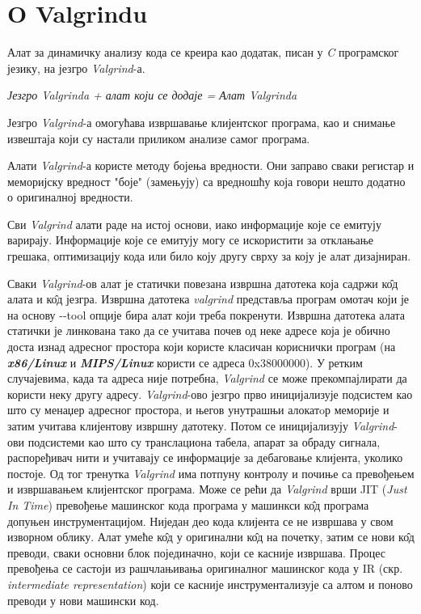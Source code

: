 \documentclass[12pt,oneside]{memoir}
\begin{document}
\section{O Valgrindu}

\indent Алат за динамичку анализу кода се креира као додатак, писан у \textit{C} програмског језику, на језгро \textit{Valgrind}-а. 


\begin{center}
\textit{Језгро Valgrinda + алат који се додаје = Алат Valgrinda} 
\end{center}


\indent Језгро \textit{Valgrind}-а омогућава извршавање клијентског програма, као и снимање извештаја који су настали приликом анализе самог програма. 

\indent Алати \textit{Valgrind}-а користе методу бојења вредности. Они заправо сваки регистар и меморијску вредност "боје" (замењују) са вредношћу која говори нешто додатно о оригиналној вредности. 

\indent Сви \textit{Valgrind} алати раде на истој основи, иако информације које се емитују варирају. Информације које се емитују могу се искористити за отклањање грешака, оптимизацију кода или било коју другу сврху за коју је алат дизајниран.

\indent Сваки \textit{Valgrind}-ов алат је статички повезана извршна датотека која садржи к\^{о}д алата и к\^{о}д језгра. Извршна датотека \textit{valgrind} представља програм омотач који је на основу -\--tool опције бира алат који треба покренути. Извршна датотека алата статички је линкована тако да се учитава почев од неке адресе која је обично доста изнад адресног простора који користе класичан кориснички програм (на \textbf{\textit{x86/Linux}} и \textbf{\textit{MIPS/Linux}} користи се адреса 0x38000000). У ретким случајевима, када та адреса није потребна, \textit{Valgrind} се може прекомпајлирати да користи неку другу адресу. \textit{Valgrind}-ово језгро прво иницијализује подсистем као што су менаџер адресног простора, и његов унутрашњи алокатoр меморије и затим учитава клијентову извршну датотеку. Потом се иницијализују \textit{Valgrind}-ови подсистеми као што су транслациона табела, апарат за обраду сигнала, распоређивач нити и учитавају се информације за дебаговање клијента, уколико постоје. Од тог тренутка \textit{Valgrind} има потпуну контролу и почиње са превођењем и извршавањем клијентског програма. Може се рећи да \textit{Valgrind} врши JIT (\textit{Just In Time}) превођење машинског кода програма у машинкси к\^{о}д програма допуњен инструментацијом. Ниједан део кода клијента се не извршава у свом изворном облику. Алат умеће к\^{о}д у оригинални к\^{о}д на почетку, затим се нови к\^{о}д преводи, сваки основни блок појединачно, који се касније извршава. Процес превођења се састоји из рашчлањивања оригиналног машинског кода у IR (скр. \textit{intermediate representation}) који се касније инструментализује са алтом и поново преводи у нови машински код. 
\end{document}

